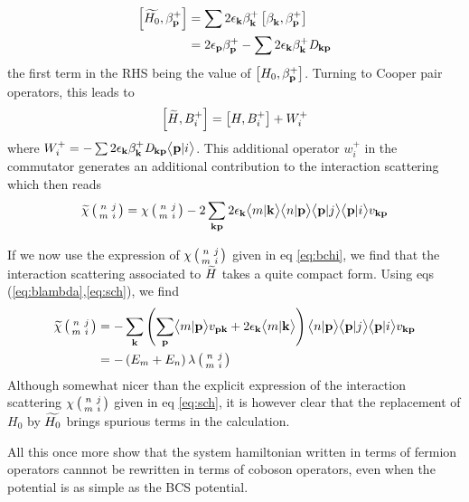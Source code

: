 \begin{equation}
\begin{split}
\left[\widetilde{H_0},\beta^+_{\mathbf{p}}\right]&=\sum2\epsilon_{\mathbf{k}}\beta^+_{\mathbf{k}}\left[\beta^{}_{\mathbf{k}},\beta^+_{\mathbf{p}}\right]\\
	&=2\epsilon_{\mathbf{p}}\beta^+_{\mathbf{p}}-\sum2\epsilon_{\mathbf{k}}\beta^+_{\mathbf{k}}{}\mathit{D}_{\mathbf{k}\mathbf{p}}
\end{split}
\end{equation}
the first term in the RHS being the value of $\left[{H_0},\beta^+_{\mathbf{p}}\right]$. Turning to Cooper pair operators, this leads to 
\begin{equation}
\left[\widetilde{H},B^+_i\right]=\left[{H},B^+_i\right]+W^+_i
\end{equation}
where $W^+_i=-\sum2\epsilon_{\mathbf{k}}\beta^+_{\mathbf{k}}{}\mathit{D}_{\mathbf{k}\mathbf{p}}\bigl<{{\mathbf{p}}|{i}}\bigr>$.  This additional operator $w^+_i$ in the commutator generates an additional contribution to the interaction scattering which then reads
\begin{equation}
\widetilde{\chi}\left(\begin{smallmatrix}n&j\\m&i\end{smallmatrix}\right)=\chi\left(\begin{smallmatrix}n&j\\m&i\end{smallmatrix}\right)-2\sum_{\mathbf{k}\mathbf{p}}2\epsilon_{\mathbf{k}}{\bigl<{{m}|{\mathbf{k}}}\bigr>\bigl<{{n}|{\mathbf{p}}}\bigr>\bigl<{{\mathbf{p}}|{j}}\bigr>\bigl<{{\mathbf{p}}|{i}}\bigr>v_{\mathbf{k}\mathbf{p}}}
\end{equation}

If we now use the expression of $\chi\left(\begin{smallmatrix}n&j\\m&i\end{smallmatrix}\right)$ given in eq \eqref{eq:bchi}, we find that the interaction scattering associated to $\widetilde{H}$ takes a quite compact form. Using eqs (\ref{eq:blambda},\ref{eq:sch}), we find
\begin{equation}
\begin{split}
\widetilde{\chi}\left(\begin{smallmatrix}n&j\\m&i\end{smallmatrix}\right)&=-\sum_{\mathbf{k}}\left(\sum_{\mathbf{p}}\bigl<{{m}|{\mathbf{p}}}\bigr>v_{\mathbf{p}\mathbf{k}}+2\epsilon_{\mathbf{k}}\bigl<{{m}|{\mathbf{k}}}\bigr>\right)\bigl<{{n}|{\mathbf{p}}}\bigr>\bigl<{{\mathbf{p}}|{j}}\bigr>\bigl<{{\mathbf{p}}|{i}}\bigr>v_{\mathbf{k}\mathbf{p}}\\
&=-\left(E_m+E_n\right)\lambda\left(\begin{smallmatrix}n&j\\m&i\end{smallmatrix}\right)
\end{split}
\end{equation}
Although somewhat nicer than the explicit expression of the interaction scattering $\chi\left(\begin{smallmatrix}n&j\\m&i\end{smallmatrix}\right)$ given in eq \eqref{eq:sch}, it is however clear that the replacement of $H_0$ by  $\widetilde{H_0}$ brings spurious terms in the calculation.

All this once more show that the system hamiltonian written in terms of fermion operators cannnot be rewritten in terms of coboson operators, even when the potential is as simple as the BCS potential. 
